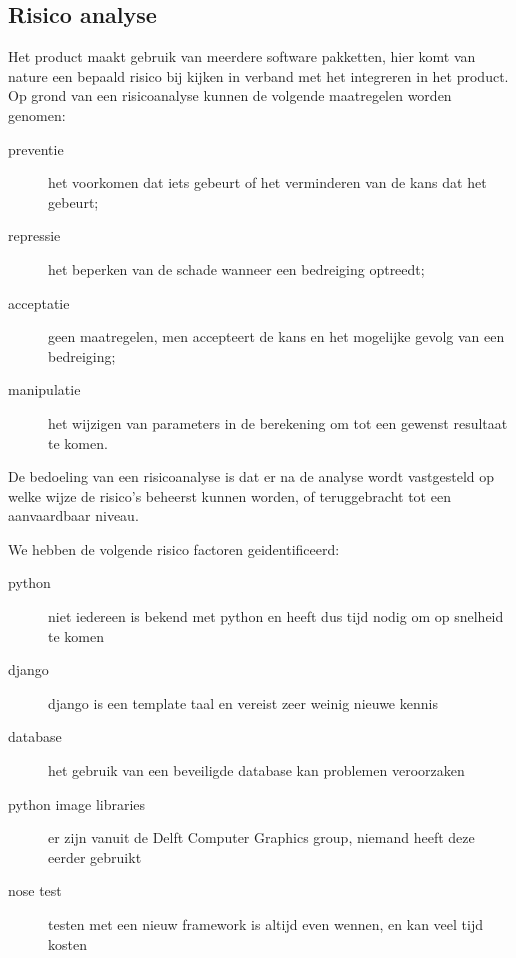 




\subsection{Risico analyse}

Het product maakt gebruik van meerdere software pakketten,
hier komt van nature een bepaald risico bij kijken in verband met het integreren in het product.
Op grond van een risicoanalyse kunnen de volgende maatregelen worden genomen:
\begin{description}
    \item[preventie] het voorkomen dat iets gebeurt of het verminderen van de kans dat het gebeurt;
    \item[repressie] het beperken van de schade wanneer een bedreiging optreedt;
    \item[acceptatie] geen maatregelen, men accepteert de kans en het mogelijke gevolg van een bedreiging;
    \item[manipulatie] het wijzigen van parameters in de berekening om tot een gewenst resultaat te komen.
\end{description}

De bedoeling van een risicoanalyse is dat er na de analyse wordt vastgesteld op welke wijze de risico's beheerst kunnen worden, of teruggebracht tot een aanvaardbaar niveau. \cite{wiki:risico_analyse}

We hebben de volgende risico factoren geidentificeerd:
\begin{description}
    \item[python] niet iedereen is bekend met python en heeft dus tijd nodig om op snelheid te komen
    \item[django] django is een template taal en vereist zeer weinig nieuwe kennis
    \item[database] het gebruik van een beveiligde database kan problemen veroorzaken
    \item[python image libraries] er zijn vanuit de Delft Computer Graphics group, niemand heeft deze eerder gebruikt
    \item[nose test] testen met een nieuw framework is altijd even wennen, en kan veel tijd kosten
\end{description}

